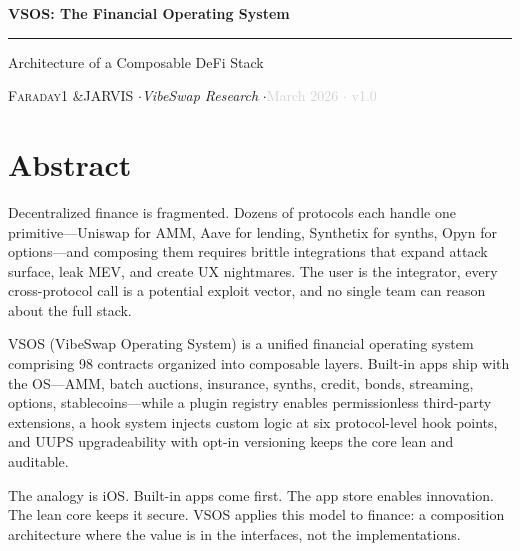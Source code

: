 \documentclass[9pt, letterpaper]{article}
\begin{document}

\begin{center}
\vspace*{-0.15in}
{\Large\bfseries VSOS: The Financial Operating System}

\vspace{3pt}
\textcolor{rule}{\rule{4in}{0.5pt}}
\vspace{3pt}

{\small Architecture of a Composable DeFi Stack}

\vspace{6pt}
{\small\textsc{Faraday1} \enspace\&\enspace \textsc{JARVIS}%
\quad$\cdot$\quad \textit{VibeSwap Research}%
\quad$\cdot$\quad \textcolor{lightgray}{March 2026 $\cdot$ v1.0}}
\vspace{0.1in}
\end{center}


\section*{Abstract}

Decentralized finance is fragmented. Dozens of protocols each handle one primitive---Uniswap for AMM, Aave for lending, Synthetix for synths, Opyn for options---and composing them requires brittle integrations that expand attack surface, leak MEV, and create UX nightmares. The user is the integrator, every cross-protocol call is a potential exploit vector, and no single team can reason about the full stack.

VSOS (VibeSwap Operating System) is a unified financial operating system comprising 98 contracts organized into composable layers. Built-in apps ship with the OS---AMM, batch auctions, insurance, synths, credit, bonds, streaming, options, stablecoins---while a plugin registry enables permissionless third-party extensions, a hook system injects custom logic at six protocol-level hook points, and UUPS upgradeability with opt-in versioning keeps the core lean and auditable.

The analogy is iOS. Built-in apps come first. The app store enables innovation. The lean core keeps it secure. VSOS applies this model to finance: a composition architecture where the value is in the interfaces, not the implementations.
\end{document}
